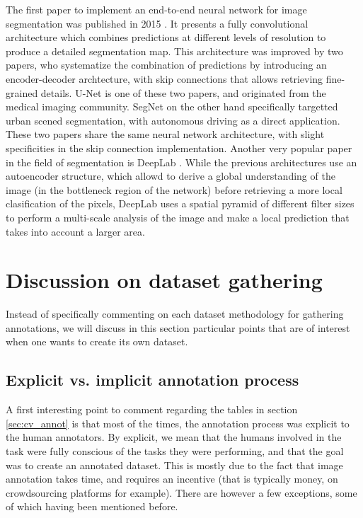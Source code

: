 The first paper to implement an end-to-end neural network for image segmentation was published in 2015 \cite{long2015fully}. It presents a fully convolutional architecture which combines predictions at different levels of resolution to produce a detailed segmentation map. This architecture was improved by two papers, who systematize the combination of predictions by introducing an encoder-decoder archtecture, with skip connections that allows retrieving fine-grained details. U-Net \cite{ronneberger2015u} is one of these two papers, and originated from the medical imaging community. SegNet \cite{badrinarayanan2017segnet} on the other hand specifically targetted urban scened segmentation, with autonomous driving as a direct application. These two papers share the same neural network architecture, with slight specificities in the skip connection implementation. Another very popular paper in the field of segmentation is DeepLab \cite{chen2017deeplab}. While the previous architectures use an autoencoder structure, which allowd to derive a global understanding of the image (in the bottleneck region of the network) before retrieving a more local clasification of the pixels, DeepLab uses a spatial pyramid of different filter sizes to perform a multi-scale analysis of the image and make a local prediction that takes into account a larger area.

\section{Discussion on dataset gathering}

Instead of specifically commenting on each dataset methodology for gathering annotations, we will discuss in this section particular points that are of interest when one wants to create its own dataset. 

\subsection{Explicit vs. implicit annotation process}
A first interesting point to comment regarding the tables in section \ref{sec:cv_annot} is that most of the times, the annotation process was explicit to the human annotators. By explicit, we mean that the humans involved in the task were fully conscious of the tasks they were performing, and that the goal was to create an annotated dataset. This is mostly due to the fact that image annotation takes time, and requires an incentive (that is typically money, on crowdsourcing platforms for example). There are however a few exceptions, some of which having been mentioned before. 


